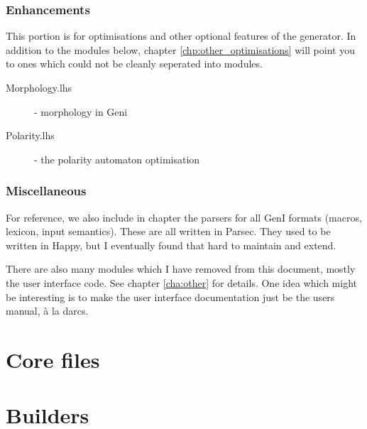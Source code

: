 \documentclass[a4paper,11pt]{report}
\begin{document}
\section{Enhancements}

This portion is for optimisations and other optional features of the
generator.
In addition to the modules below, chapter \ref{chp:other_optimisations}
will point you to ones which could not be cleanly seperated into
modules.

\begin{description}
 \item[Morphology.lhs] - morphology in Geni  
 \item[Polarity.lhs]   - the polarity automaton optimisation 
\end{description}

\section{Miscellaneous}

For reference, we also include in chapter \label{cha:GeniParsers} the
parsers for all GenI formats (macros, lexicon, input semantics).  These
are all written in Parsec.  They used to be written in Happy, but I
eventually found that hard to maintain and extend.

There are also many modules which I have removed from this document,
mostly the user interface code.  See chapter \ref{cha:other} for
details.  One idea which might be interesting is to make the user
interface documentation just be the users manual, \`a la darcs.




\part{Core files}

       
       
       
       

\part{Builders}
\label{prt:builders}

       


\end{document}
